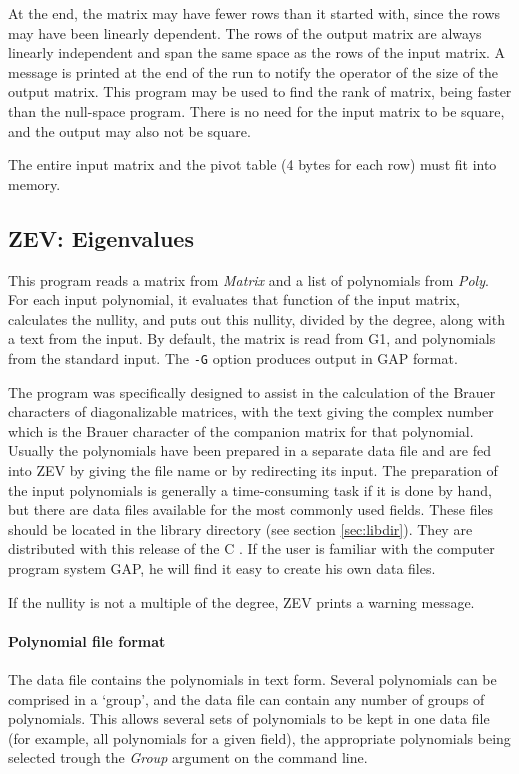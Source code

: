 At the end, the matrix may have fewer rows than it started with, since
the rows may have been linearly dependent. The rows of the output matrix
are always linearly independent and span the same space
as the rows of the input matrix. A message
is printed at the end of the run to notify the operator of the size of
the output matrix. This program may be used to find the rank of 
matrix, being faster than the null-space program. There is no need for
the input matrix to be square, and the output may also not be square.


\Limits
The entire input matrix and the pivot table (4 bytes for each row)
must fit into memory.




\subsection{ZEV: Eigenvalues}
\Syntax
{}

\Description
This program reads a matrix from {\it Matrix} and a list of polynomials
from {\it Poly}. For each input polynomial, it evaluates that function
of the input matrix, calculates the nullity, and puts out this nullity,
divided by the degree, along with a text from the input.
By default, the matrix is read from G1, and polynomials from the
standard input. The {\tt -G} option produces output in GAP format.

The program was specifically designed to assist in the calculation of
the Brauer characters of diagonalizable matrices, with the text giving
the complex number which is the Brauer character of the companion
matrix for that polynomial. Usually the polynomials have been prepared
in a separate data file and are fed into ZEV by giving the file name or
by redirecting its input. The preparation of the input polynomials
is generally a time-consuming task if it is done by hand, but there are
data files available for the most commonly used fields. These
files should be located in the library directory (see section
\ref{sec:libdir}). They are distributed with this release of the C
{\MeatAxe}. If the user is familiar with the computer program system
GAP, he will find it easy to create his own data files.

If the nullity is not a multiple of the degree, ZEV prints a
warning message.

\paragraph{Polynomial file format}
The data file contains the polynomials in text form. Several
polynomials can be comprised in a `group', and the data file
can contain any number of groups of polynomials.
This allows several sets of polynomials to be kept in one data file
(for example, all polynomials for a given field), the appropriate
polynomials being selected trough the {\it Group} argument on the
command line.

